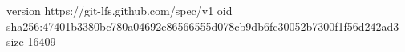 version https://git-lfs.github.com/spec/v1
oid sha256:47401b3380bc780a04692e86566555d078cb9db6fc30052b7300f1f56d242ad3
size 16409
